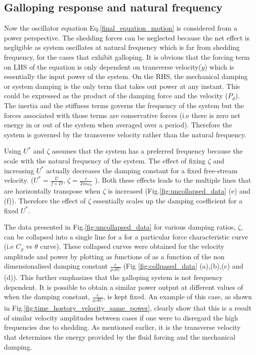  \subsection{Galloping response and natural frequency}
 
 Now the oscillator equation Eq.\eqref{final_equation_motion} is considered from a power perspective. The shedding forces can be neglected because the net effect is negligible as system oscillates at natural frequency which is far from shedding frequency, for the cases that exhibit galloping. It is obvious that the forcing term on LHS of the equation is only dependent on transverse velocity($\dot{y}$) which is essentially the input power of the system. On the RHS, the mechanical damping or system damping is the only term that takes out power at any instant. This could be expressed as the product of the damping force and the velocity ($P_d$). The inertia and the stiffness terms governs the frequency of the system but the forces associated with those terms are conservative forces (i.e there is zero net energy in or out of the system when averaged over a period). Therefore the system is governed by the transverse velocity rather than the natural frequency.
 

 Using $U^*$ and $\zeta$ assumes that the system has a preferred frequency because the scale with the natural frequency of the system. The effect of fixing $\zeta$ and increasing $U^*$ actually decreases the damping constant for a fixed free-stream velocity. ($U^*=\frac{U}{f \times D}$, $\zeta= \frac{c}{2 m \omega_n}$ ). Both these effects leads to the multiple lines that are horizontally transpose when $\zeta$ is increased (Fig.\ref{fig:uncollapsed_data} (e) and (f)). Therefore the effect of $\zeta$ essentially scales up the damping coefficient for a fixed $U^*$.
 
 The data presented in Fig.\ref{fig:uncollapsed_data} for various damping ratios, $\zeta$, can be collapsed into a single line for a for a particular force characteristic curve (i.e $C_y$ vs $\theta$ curve). These collapsed curves were  obtained for the velocity amplitude  and power by plotting as functions of as a function of  the non dimensionalised  damping constant $\frac{c}{\rho\mathcal{A}U}$ 
(Fig \ref{fig:collpased_data} (a),(b),(c) and (d)).  This further emphasizes that the galloping system is not frequency dependent. It is possible to obtain a similar power output at different values of \ustar when the damping constant, $\frac{c}{\rho\mathcal{A}U}$, is kept fixed. An example of this case, as shown in Fig.\ref{fig:time_hostory_velocity_same_power}, clearly show that this is a result of similar velocity amplitudes between cases if one were to disregard the high frequencies due to shedding. As mentioned earlier, it is the transverse velocity that determines the energy provided by the fluid forcing and the mechanical damping.

